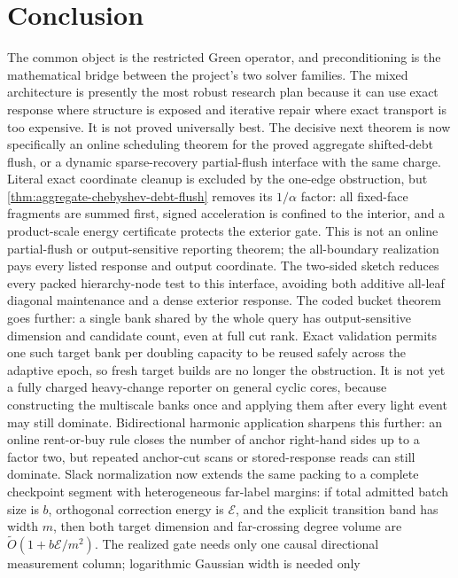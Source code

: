 \section{Conclusion}
\label{sec:conclusion}

The common object is the restricted Green operator, and preconditioning is the
mathematical bridge between the project's two solver families.  The mixed
architecture is presently the most robust research plan because it can use
exact response where structure is exposed and iterative repair where exact
transport is too expensive.  It is not proved universally best.  The decisive
next theorem is now specifically an online scheduling theorem for the proved
aggregate shifted-debt flush, or a dynamic sparse-recovery partial-flush
interface with the same charge.  Literal exact coordinate cleanup is excluded
by the one-edge obstruction, but
\cref{thm:aggregate-chebyshev-debt-flush} removes its $1/\alpha$ factor:
all fixed-face fragments are summed first, signed acceleration is confined to
the interior, and a product-scale energy certificate protects the exterior
gate.  This is not an online partial-flush or output-sensitive reporting
theorem; the all-boundary realization pays every listed response and output
coordinate.
The two-sided sketch reduces every packed hierarchy-node test to this
interface, avoiding both additive all-leaf diagonal maintenance and a dense
exterior response.  The coded bucket theorem goes further: a single bank
shared by the whole query has output-sensitive dimension and candidate count,
even at full cut rank.  Exact validation permits one such target bank per
doubling capacity to be reused safely across the adaptive epoch, so fresh
target builds are no longer the obstruction.  It is not yet a fully charged
heavy-change reporter on general cyclic cores, because constructing the
multiscale banks once and applying them after every light event may
still dominate.  Bidirectional harmonic application sharpens this further:
an online rent-or-buy rule closes the number of anchor right-hand sides up to
a factor two, but repeated anchor-cut scans or stored-response reads can still
dominate.  Slack normalization now extends the same packing to a complete
checkpoint segment with heterogeneous far-label margins: if total admitted
batch size is $b$, orthogonal correction energy is $\mathcal E$, and the
explicit transition band has width $m$, then both target dimension and
far-crossing degree volume are
$\widetilde O(1+b\mathcal E/m^2)$.  The realized gate needs only one causal
directional measurement column; logarithmic Gaussian width is needed only
